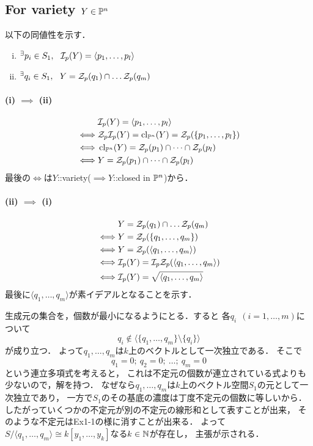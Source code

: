 \documentclass[a4paper]{jarticle}
\begin{document}
    \subsection{For variety $Y \in \mathbb{P}^n$}
    以下の同値性を示す．
    \begin{enumerate}[(i)]
        \item ${}^{\exists} p_i \in S_1,~~ \mathcal{I}_p(Y)=\langle p_1, \dots, p_l \rangle$
        \item ${}^{\exists} q_i \in S_1,~~ Y=\mathcal{Z}_p(q_1) \cap \dots \mathcal{Z}_p(q_m)$
    \end{enumerate}
    \paragraph{(i) $\implies$ (ii)}
    \begin{align*}
            &   \mathcal{I}_p(Y)=\langle p_1, \dots, p_l \rangle \\
        \iff&   \mathcal{Z}_p \mathcal{I}_p(Y)=\operatorname{cl}_{\mathbb{P}^n}(Y)=\mathcal{Z}_p(\{ p_1, \dots, p_l \}) \\
        \iff&   \operatorname{cl}_{\mathbb{P}^n}(Y)=\mathcal{Z}_p(p_1)\cap \dots \cap \mathcal{Z}_p(p_l) \\
        \iff&   Y=\mathcal{Z}_p(p_1)\cap \dots \cap \mathcal{Z}_p(p_l)
    \end{align*}
    最後の$\iff$は$Y$::variety($\implies Y$::closed in $\mathbb{P}^n$)から．

    \paragraph{(ii) $\implies$ (i)}
    \begin{align*}
            &   Y=\mathcal{Z}_p(q_1) \cap \dots \mathcal{Z}_p(q_m) \\
        \iff&   Y=\mathcal{Z}_p(\{q_1, \dots, q_m \}) \\
        \iff&   Y=\mathcal{Z}_p(\langle q_1, \dots, q_m \rangle) \\
        \iff&   \mathcal{I}_p(Y)=\mathcal{I}_p \mathcal{Z}_p(\langle q_1, \dots, q_m \rangle) \\
        \iff&   \mathcal{I}_p(Y)=\sqrt{\langle q_1, \dots, q_m \rangle}
    \end{align*}
    最後に$\langle q_1, \dots, q_m \rangle$が素イデアルとなることを示す．
    
    生成元の集合を，個数が最小になるようにとる．すると
    各$q_i~~(i=1,\dots,m)$について
    \[ q_i \not \in \langle \{q_1, \dots, q_m\} \setminus \{q_i\} \rangle \]が成り立つ．
    よって$q_1, \dots, q_m$は$k$上のベクトルとして一次独立である．
    そこで
    \[ q_1=0;~ q_2=0;~ \dots;~ q_m=0 \]
    という連立多項式を考えると，
    これは不定元の個数が連立されている式よりも少ないので，解を持つ．
    なぜなら$q_1, \dots, q_m$は$k$上のベクトル空間$S_1$の元として一次独立であり，
    一方で$S_1$のその基底の濃度は丁度不定元の個数に等しいから．
    したがっていくつかの不定元が別の不定元の線形和として表すことが出来，
    そのような不定元はEx1-1の様に消すことが出来る．
    よって$S/\langle q_1, \dots, q_m \rangle \cong k[y_1,\dots,y_k]$なる$k \in \mathbb{N}$が存在し，
    主張が示される．
\end{document}
